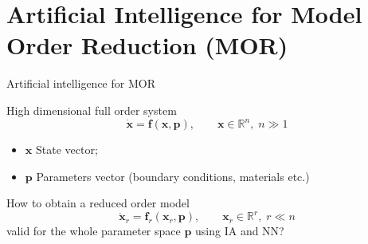 \documentclass{beamer}
\begin{document}
\section{Artificial Intelligence for Model Order Reduction (MOR)}

\begin{frame}{Artificial intelligence for MOR}


High dimensional full order system
\begin{equation*}
	\dot{\mathbf{x}} = \mathbf{f}(\mathbf{x}, \mathbf{p}), \qquad \mathbf{x} \in \mathbb{R}^n, \; n \gg 1
\end{equation*}
\begin{itemize}
	\item $\mathbf{x}$ State vector;
	\item $\mathbf{p}$ Parameters vector (boundary conditions, materials etc.)
\end{itemize}
How to obtain a reduced order model
\begin{equation*}
	\dot{\mathbf{x}}_r = \mathbf{f}_r(\mathbf{x}_r, \mathbf{p}), \qquad \mathbf{x}_r \in \mathbb{R}^r, \; r \ll n
\end{equation*}
valid for the whole parameter space $\mathbf{p}$ using IA and NN?

\end{frame}
\end{document}
